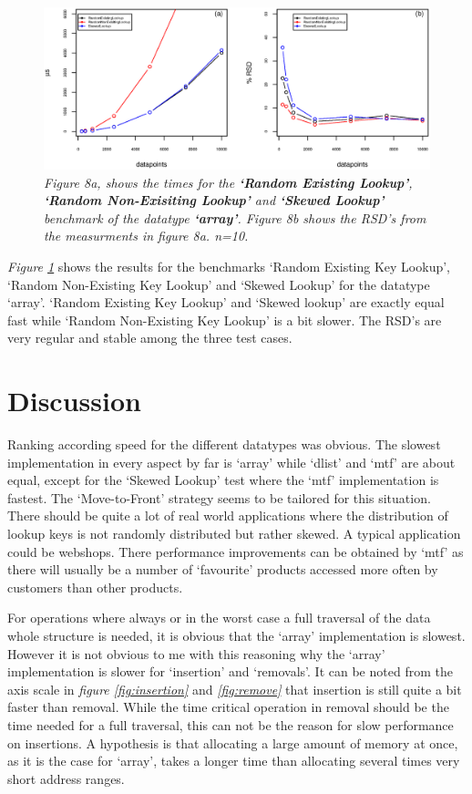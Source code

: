 \documentclass[a4paper,11pt,twoside]{article}
\begin{document}
\begin{figure}[H] 
\centering 
\includegraphics[width=\textwidth]{figures/fig8.eps}
\caption{\textit{Figure 8a, shows the times for the \textbf{`Random Existing
    Lookup'}, \textbf{`Random Non-Exisiting Lookup'} and
  \textbf{`Skewed Lookup'} benchmark of the datatype \textbf{`array'}. Figure 8b shows the RSD's from the measurments
in figure 8a. n=10.}}
\label{fig:array}
\end{figure}

\textit{Figure \ref{fig:array}} shows the results for the benchmarks
`Random Existing Key Lookup', `Random Non-Existing Key Lookup' and
`Skewed Lookup' for the datatype `array'. `Random Existing Key Lookup' and
`Skewed lookup' are exactly equal fast while `Random Non-Existing Key
Lookup' is a bit slower. The RSD's are very regular and stable among
the three test cases.


\section{Discussion}
Ranking according speed for the different datatypes was obvious. 
The slowest implementation in every aspect by far is
`array' while `dlist' and `mtf' are about equal, except for the
`Skewed Lookup' test where the `mtf' implementation is fastest. 
The `Move-to-Front' strategy seems to be tailored for this
situation. There should be quite a lot of real world
applications where the distribution of lookup keys is not randomly
distributed but rather skewed. A typical application could be webshops.
There performance improvements can be obtained by `mtf' as there will
usually be a number of `favourite' products accessed more often by 
customers than other products.

For operations where always or in the worst case a full
traversal of the data whole structure is needed, it is obvious that the
`array' implementation is slowest. However it is not obvious to me with this
reasoning why the `array' implementation is slower for `insertion' and
`removals'. It can be noted from the axis scale in \textit{figure
  \ref{fig:insertion}} and \textit{\ref{fig:remove}} that insertion is
still quite a bit faster than removal. While the time critical
operation in removal should be the time needed for a full traversal, 
this can not be the reason for slow performance on insertions. 
A hypothesis is that allocating a large amount of memory at once, 
as it is the case for `array',  takes a longer time than allocating 
several times very short address ranges. 
\end{document}
